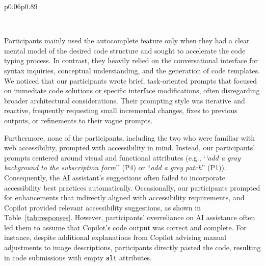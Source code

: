 \begin{table*}
\begin{tabular}{p{0.06\textwidth}p{0.89\textwidth}}
{\begin{minipage}{\linewidth}
  \end{minipage}}
    \\
  \bottomrule
\end{tabular}
    \label{tab:responses}
\end{table*}

Participants mainly used the autocomplete feature only when they had a clear mental model of the desired code structure and sought to accelerate the code typing process. In contrast, they heavily relied on the conversational interface for syntax inquiries, conceptual understanding, and the generation of code templates. We noticed that our participants wrote brief, task-oriented prompts that focused on immediate code solutions or specific interface modifications, often disregarding broader architectural considerations. Their prompting style was iterative and reactive, frequently requesting small incremental changes, fixes to previous outputs, or refinements to their vague prompts. 

Furthermore, none of the participants, including the two who were familiar with web accessibility, prompted with accessibility in mind. Instead, our participants' prompts centered around visual and functional attributes (e.g., `\textit{`add a gray background to the subscription form}'' (P4) or ``\textit{add a grey patch}'' (P1)). Consequently, the AI assistant's suggestions often failed to incorporate accessibility best practices automatically. Occasionally, our participants prompted for enhancements that indirectly aligned with accessibility requirements, and Copilot provided relevant accessibility suggestions, as shown in Table~\ref{tab:responses}. However, participants' overreliance on AI assistance often led them to assume that Copilot's code output was correct and complete. For instance, despite additional explanations from Copilot advising manual adjustments to image descriptions, participants directly pasted the code, resulting in code submissions with empty \colorbox{codebgd}{\texttt{alt}} attributes.

